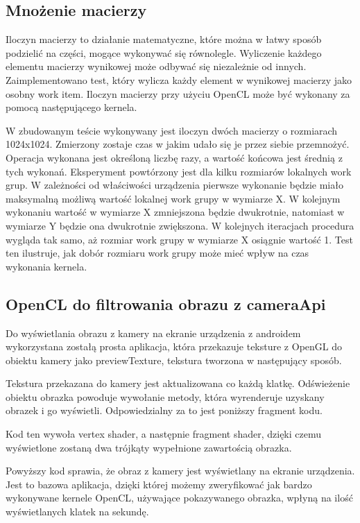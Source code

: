 \subsection[Mnożenie macierzy]{Mnożenie macierzy}
Iloczyn macierzy to działanie matematyczne, które można w łatwy sposób podzielić na części, mogące wykonywać się równolegle. Wyliczenie każdego elementu macierzy wynikowej może odbywać się niezależnie od innych. Zaimplementowano test, który wylicza każdy element w wynikowej macierzy jako osobny work item. Iloczyn macierzy przy użyciu OpenCL może być wykonany za pomocą następującego kernela.

W zbudowanym teście wykonywany jest iloczyn dwóch macierzy o rozmiarach 1024x1024. Zmierzony zostaje czas w jakim udało się je przez siebie przemnożyć. Operacja wykonana jest określoną liczbę razy, a wartość końcowa jest średnią z tych wykonań. Eksperyment powtórzony jest dla kilku rozmiarów lokalnych work grup. W zależności od właściwości urządzenia pierwsze wykonanie będzie miało maksymalną możliwą wartość lokalnej work grupy w wymiarze X. W kolejnym wykonaniu wartość w wymiarze X zmniejszona będzie dwukrotnie, natomiast w wymiarze Y będzie ona dwukrotnie zwiększona. W kolejnych iteracjach procedura wygląda tak samo, aż rozmiar work grupy w wymiarze X osiągnie wartość 1. Test ten ilustruje, jak dobór rozmiaru work grupy może mieć wpływ na czas wykonania kernela.
\subsection[OpenCL do filtrowania obrazu z cameraApi]{OpenCL do filtrowania obrazu z cameraApi}
Do wyświetlania obrazu z kamery na ekranie urządzenia z androidem wykorzystana zostałą prosta aplikacja, która przekazuje teksture z OpenGL do obiektu kamery jako previewTexture, tekstura tworzona w następujący sposób.

 Tekstura przekazana do kamery jest aktualizowana co każdą klatkę. Odświeżenie obiektu obrazka powoduje wywołanie metody, która wyrenderuje uzyskany obrazek i go wyświetli. Odpowiedzialny za to jest poniższy fragment kodu.
 

Kod ten wywoła vertex shader, a następnie fragment shader, dzięki czemu wyświetlone zostaną dwa trójkąty wypełnione zawartością obrazka.

Powyższy kod sprawia, że obraz z kamery jest wyświetlany na ekranie urządzenia. Jest to bazowa aplikacja, dzięki której możemy zweryfikować jak bardzo wykonywane kernele OpenCL, używające pokazywanego obrazka, wpłyną na ilość wyświetlanych klatek na sekundę.
